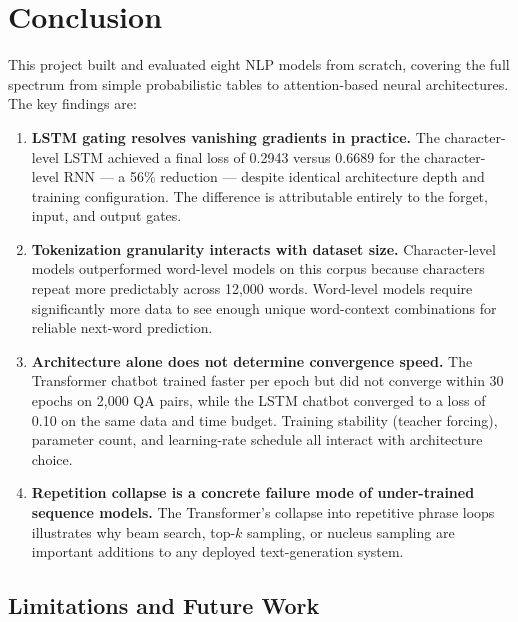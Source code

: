 \section{Conclusion}
\label{sec:conclusion}

This project built and evaluated eight NLP models from scratch, covering the full
spectrum from simple probabilistic tables to attention-based neural architectures.
The key findings are:

\begin{enumerate}
    \item \textbf{LSTM gating resolves vanishing gradients in practice.}
          The character-level LSTM achieved a final loss of 0.2943 versus 0.6689
          for the character-level RNN — a 56\% reduction — despite identical
          architecture depth and training configuration. The difference is
          attributable entirely to the forget, input, and output gates.

    \item \textbf{Tokenization granularity interacts with dataset size.}
          Character-level models outperformed word-level models on this corpus
          because characters repeat more predictably across 12,000 words. Word-level
          models require significantly more data to see enough unique word-context
          combinations for reliable next-word prediction.

    \item \textbf{Architecture alone does not determine convergence speed.}
          The Transformer chatbot trained faster per epoch but did not converge
          within 30 epochs on 2,000 QA pairs, while the LSTM chatbot converged to
          a loss of 0.10 on the same data and time budget. Training stability
          (teacher forcing), parameter count, and learning-rate schedule all
          interact with architecture choice.

    \item \textbf{Repetition collapse is a concrete failure mode of under-trained
          sequence models.} The Transformer's collapse into repetitive phrase loops
          illustrates why beam search, top-$k$ sampling, or nucleus sampling are
          important additions to any deployed text-generation system.
\end{enumerate}

\subsection*{Limitations and Future Work}

